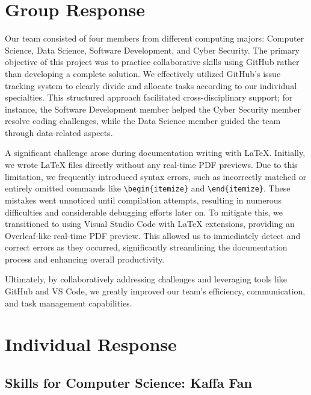 \documentclass[a4paper, 11pt]{report}
\begin{document}

\tableofcontents

\newpage

\section{Group Response}

Our team consisted of four members from different computing majors: Computer Science, Data Science, Software Development, and Cyber Security. The primary objective of this project was to practice collaborative skills using GitHub rather than developing a complete solution. We effectively utilized GitHub's issue tracking system to clearly divide and allocate tasks according to our individual specialties. This structured approach facilitated cross-disciplinary support; for instance, the Software Development member helped the Cyber Security member resolve coding challenges, while the Data Science member guided the team through data-related aspects.

A significant challenge arose during documentation writing with LaTeX. Initially, we wrote LaTeX files directly without any real-time PDF previews. Due to this limitation, we frequently introduced syntax errors, such as incorrectly matched or entirely omitted commands like \texttt{\textbackslash begin\{itemize\}} and \texttt{\textbackslash end\{itemize\}}. These mistakes went unnoticed until compilation attempts, resulting in numerous difficulties and considerable debugging efforts later on. To mitigate this, we transitioned to using Visual Studio Code with LaTeX extensions, providing an Overleaf-like real-time PDF preview. This allowed us to immediately detect and correct errors as they occurred, significantly streamlining the documentation process and enhancing overall productivity.

Ultimately, by collaboratively addressing challenges and leveraging tools like GitHub and VS Code, we greatly improved our team's efficiency, communication, and task management capabilities.

\newpage
\section{Individual Response}

\subsection{Skills for Computer Science: Kaffa Fan }
\end{document}
